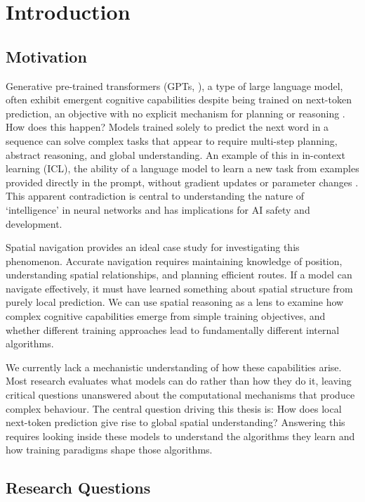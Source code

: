 \chapter{Introduction}

\section{Motivation}

Generative pre-trained transformers (GPTs, \cite{radford2018improving}), a type of large language model, often exhibit emergent cognitive capabilities despite being trained on next-token prediction, an objective with no explicit mechanism for planning or reasoning \citep{ bubeck2023sparksartificialgeneralintelligence, bachmann2024ntp}. How does this happen? Models trained solely to predict the next word in a sequence can solve complex tasks that appear to require multi-step planning, abstract reasoning, and global understanding. An example of this in in-context learning (ICL), the ability of a language model to learn a new task from examples provided directly in the prompt, without gradient updates or parameter changes \citep{brown2020languagemodelsfewshotlearners}. This apparent contradiction is central to understanding the nature of `intelligence' in neural networks and has implications for AI safety and development.

Spatial navigation provides an ideal case study for investigating this phenomenon. Accurate navigation requires maintaining knowledge of position, understanding spatial relationships, and planning efficient routes. If a model can navigate effectively, it must have learned something about spatial structure from purely local prediction. We can use spatial reasoning as a lens to examine how complex cognitive capabilities emerge from simple training objectives, and whether different training approaches lead to fundamentally different internal algorithms.

We currently lack a mechanistic understanding of how these capabilities arise. Most research evaluates what models can do rather than how they do it, leaving critical questions unanswered about the computational mechanisms that produce complex behaviour. The central question driving this thesis is: How does local next-token prediction give rise to global spatial understanding? Answering this requires looking inside these models to understand the algorithms they learn and how training paradigms shape those algorithms.

\section{Research Questions}

